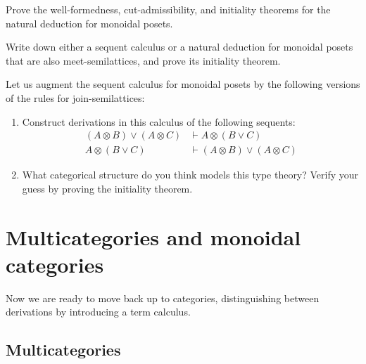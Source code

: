 \documentclass{book}
\let\types\vdash
\def\type{\;\ftype}
\let\join\vee
\let\tensor\otimes
\begin{document}
\begin{ex}\label{ex:natded-monpos}
  Prove the well-formedness, cut-admissibility, and initiality theorems for the natural deduction for monoidal posets.
\end{ex}

\begin{ex}\label{ex:monpos-mslat}
  Write down either a sequent calculus or a natural deduction for monoidal posets that are also meet-semilattices, and prove its initiality theorem.
\end{ex}

\begin{ex}\label{ex:monpos-jslat}
  Let us augment the sequent calculus for monoidal posets by the following versions of the rules for join-semilattices:
  \begin{enumerate}
  \item Construct derivations in this calculus of the following sequents:
    \begin{align*}
      (A\tensor B)\join (A\tensor C) &\types  A\tensor (B\join C)\\
      A\tensor (B\join C) &\types (A\tensor B)\join (A\tensor C)
    \end{align*}
  \item What categorical structure do you think models this type theory?
    Verify your guess by proving the initiality theorem.
  \end{enumerate}
\end{ex}


\section{Multicategories and monoidal categories}
\label{sec:multicat-moncat}

Now we are ready to move back up to categories, distinguishing between derivations by introducing a term calculus.

\subsection{Multicategories}
\label{sec:multicats}
\end{document}
